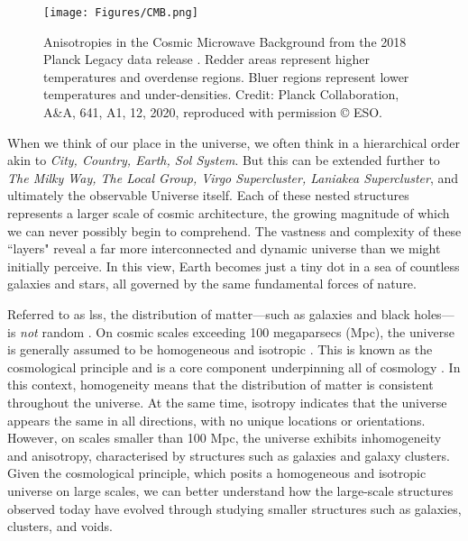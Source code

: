 \begin{figure}
    \centering
    \texttt{[image: Figures/CMB.png]}
    \caption{Anisotropies in the Cosmic Microwave Background from the 2018 Planck Legacy data release \citep{planck_collaboration_planck_2020}. Redder areas represent higher temperatures and overdense regions. Bluer regions represent lower temperatures and under-densities. Credit: Planck Collaboration, A\&A, 641, A1, 12, 2020, reproduced with permission © ESO.}
    \label{Fig: CMB}
\end{figure}

When we think of our place in the universe, we often think in a hierarchical order akin to \textit{City, Country, Earth, Sol System}. But this can be extended further to \textit{The Milky Way, The Local Group, Virgo Supercluster, Laniakea Supercluster}, and ultimately the observable Universe itself. Each of these nested structures represents a larger scale of cosmic architecture, the growing magnitude of which we can never possibly begin to comprehend. The vastness and complexity of these ``layers" reveal a far more interconnected and dynamic universe than we might initially perceive. In this view, Earth becomes just a tiny dot in a sea of countless galaxies and stars, all governed by the same fundamental forces of nature. 

Referred to as \gls{lss}, the distribution of matter---such as galaxies and black holes---is \textit{not} random \citep{bond_how_1996, coil_large-scale_2013}. On cosmic scales exceeding 100 megaparsecs (Mpc), the universe is generally assumed to be homogeneous and isotropic \citep{friedmann_uber_1922, lemaitre_univers_1927, arjona_complementary_2021, dome_cosmic_2023}. This is known as the cosmological principle and is a core component underpinning all of cosmology \citep{yadav_testing_2005, sarkar_scale_2009, planck_collaboration_planck_2016, planck_collaboration_planck_2020-1, planck_collaboration_planck_2020-2}. In this context, homogeneity means that the distribution of matter is consistent throughout the universe. At the same time, isotropy indicates that the universe appears the same in all directions, with no unique locations or orientations. However, on scales smaller than 100 Mpc, the universe exhibits inhomogeneity and anisotropy, characterised by structures such as galaxies and galaxy clusters. Given the cosmological principle, which posits a homogeneous and isotropic universe on large scales, we can better understand how the large-scale structures observed today have evolved through studying smaller structures such as galaxies, clusters, and voids.

